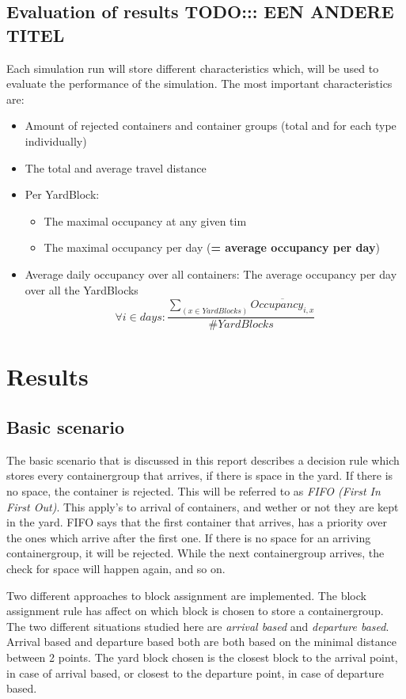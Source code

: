 \documentclass[]{article}
\begin{document}
\subsection{Evaluation of results \Large TODO::: EEN ANDERE TITEL}
Each simulation run will store different characteristics which, will be used to
evaluate the performance of the simulation. The most important characteristics
are: \begin{itemize}
	\item Amount of rejected containers and container groups (total and for each type
	      individually)
	\item The total and average travel distance
	\item Per YardBlock:
	      \begin{itemize}
		      \item The maximal occupancy at any given tim
		      \item The maximal occupancy per day (\textbf{= average occupancy per day})
	      \end{itemize}
	\item Average daily occupancy over all containers: The average occupancy per day over
	      all the YardBlocks \[\forall i \in days: \frac{\sum_{(x \in YardBlocks)}
			      \overline{Occupancy_{i,x}}}{\#YardBlocks}\]
\end{itemize}

\section{Results}

\subsection{Basic scenario}
The basic scenario that is discussed in this report describes a decision rule
which stores every containergroup that arrives, if there is space in the yard.
If there is no space, the container is rejected. This will be referred to as
\textit{FIFO (First In First Out)}. This apply's to arrival of containers, and
wether or not they are kept in the yard. FIFO says that the first container
that arrives, has a priority over the ones which arrive after the first one. If
there is no space for an arriving containergroup, it will be rejected. While
the next containergroup arrives, the check for space will happen again, and so
on. 

Two different approaches to block assignment are implemented. The block
assignment rule has affect on which block is chosen to store a containergroup.
The two different situations studied here are \textit{arrival based} and
\textit{departure based}. Arrival based and departure based both are both based
on the minimal distance between 2 points. The yard block chosen is the closest
block to the arrival point, in case of arrival based, or closest to the
departure point, in case of departure based.
\end{document}
